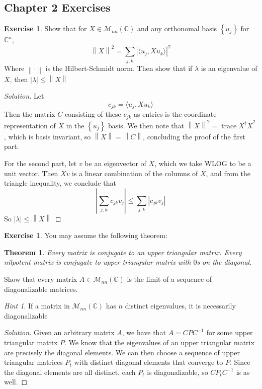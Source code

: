\documentclass[psamsfonts]{amsart}
\newtheorem*{thm*}{Theorem}
\theoremstyle{definition}
\newtheorem{exer}[thm]{Exercise}
\theoremstyle{remark}
\newtheorem*{hint*}{Hint}
\newcommand{\C}{\mathbb{C}}
\newcommand{\M}{\mathcal{M}}
\newcommand{\inv}{^{-1}}
\newcommand{\set}[1]{\left\lbrace#1 \right\rbrace}
\newcommand{\abs}[1]{\left\lvert#1\right\rvert}
\newcommand{\norm}[1]{\left\lVert#1\right\rVert}
\DeclareMathOperator{\trace}{trace}
\begin{document}
\subsection*{Chapter 2 Exercises}

\setcounter{thm}{1}
\begin{exer}
Show that for $X \in \M_{nn}(\C)$ and any orthonomal basis $\set{u_j}$ for $\C^n$,
$$ \norm{X}^2 = \sum_{j,k}\abs{\langle u_j, Xu_k \rangle}^2 $$
Where $\norm{\cdot}$ is the Hilbert-Schmidt norm. Then show that if $\lambda$ is an eigenvalue of $X$, then $\abs{\lambda} \leq \norm{X}$
\end{exer}

\begin{proof}[Solution]
Let 
$$c_{jk} = \langle u_j, Xu_k \rangle$$
Then the matrix $C$ consisting of these $c_{jk}$ as entries is the coordinate representation of $X$ in the $\set{u_j}$ basis. 
We then note that $\norm{X}^2 = \trace{X^\dagger X}^2$, which is basis invariant, so $\norm{X} = \norm{C}$, concluding the proof of the first part. 

For the second part, let $v$ be an eigenvector of $X$, which we take WLOG to be a unit vector. Then $Xv$ is a linear combination of the columns of $X$, and from the triangle inequality, we conclude that 
$$\abs{\sum_{j ,k} c_{jk}v_j }\leq \sum_{j,k}\abs{c_{jk}v_j} $$
So $\abs{\lambda} \leq \norm{X}$
\end{proof}

\setcounter{thm}{3}

\begin{exer}
You may assume the following theorem:
\begin{thm*}
Every matrix is conjugate to an upper triangular matrix. Every nilpotent matrix is conjugate to upper triangular matrix with $0$s on the diagonal.
\end{thm*}
Show that every matrix $A \in \M_{nn}(\C)$ is the limit of a sequence of diagonalizable matrices. 
\begin{hint*}
If a matrix in $\M_{nn}(\C)$ has $n$ distinct eigenvalues, it is necessarily diagonalizable
\end{hint*}
\end{exer}

\begin{proof}[Solution]
Given an arbitrary matrix $A$, we have that $A = CPC\inv$ for some upper triangular matrix $P$. We know that the eigenvalues of an upper triangular matrix are precisely the diagonal elements. We can then choose a sequence of upper triangular matrices $P_t$ with distinct diagonal elements that converge to $P$. Since the diagonal elements are all distinct, each $P_t$ is diagonalizable, so $CP_tC\inv$ is as well.
\end{proof}
\end{document}
